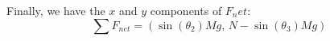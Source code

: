\documentclass{article}
\begin{document}
Finally, we have the $x$ and $y$ components of $F_net$:
\[ \boxed{\sum F_{net} = (\sin(\theta_2)Mg, \, N-\sin(\theta_3)Mg)} \]


\end{document}
